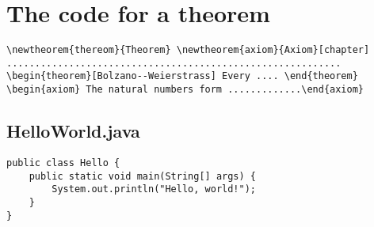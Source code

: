 \documentclass{article}
\begin{document}
\section{The code for a theorem}
\begin{verbatim}
\newtheorem{thereom}{Theorem} \newtheorem{axiom}{Axiom}[chapter]
...........................................................
\begin{theorem}[Bolzano--Weierstrass] Every .... \end{theorem}
\begin{axiom} The natural numbers form .............\end{axiom}
\end{verbatim}
\subsection{HelloWorld.java}
\begin{verbatim}
public class Hello {
    public static void main(String[] args) {
        System.out.println("Hello, world!");
    }
}
\end{verbatim}
\end{document}
